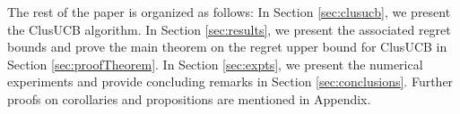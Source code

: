 The rest of the paper is organized as follows: In Section \ref{sec:clusucb}, we present the ClusUCB algorithm. In Section \ref{sec:results}, we present the associated regret bounds and prove the main theorem on the regret upper bound  for ClusUCB in Section \ref{sec:proofTheorem}. In Section \ref{sec:expts}, we present the numerical experiments and provide concluding remarks in Section \ref{sec:conclusions}. Further proofs on corollaries and propositions are mentioned in Appendix. 

